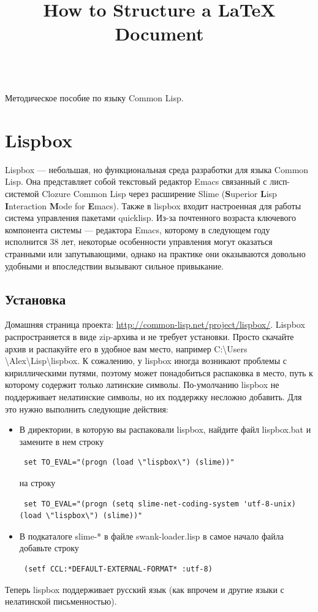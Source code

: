 \documentclass[a4paper, 10pt, titlepage, twoside]{article}
\begin{document}
\title{How to Structure a LaTeX Document}
\begin{titlepage}
  \begin{center}
    \vspace{10pt}
    
    \\
    \vspace{120pt}
    \Huge{Методическое пособие по языку Common Lisp.}
    \end{center}
\end{titlepage}

\section{Lispbox}
Lispbox --- небольшая, но функциональная среда разработки для языка Common Lisp. Она представляет собой текстовый редактор Emacs связанный с лисп-системой Clozure Common Lisp через расширение Slime (\textbf{S}uperior \textbf{L}isp \textbf{I}nteraction \textbf{M}ode for \textbf{E}macs). Также в lispbox входит настроенная для работы система управления пакетами quicklisp. Из-за почтенного возраста ключевого компонента системы --- редактора Emacs, которому в следующем году исполнится 38 лет, некоторые особенности управления могут оказаться странными или запутывающими, однако на практике они оказываются довольно удобными и впоследствии вызывают сильное привыкание.
\subsection{Установка}
Домашняя страница проекта: \url{http://common-lisp.net/project/lispbox/}. Lispbox распространяется в виде zip-архива и не требует установки. Просто скачайте архив и распакуйте его в удобное вам место, например C:\textbackslash{}Users
\textbackslash{}Alex\textbackslash{}Lisp\textbackslash{}lispbox. К сожалению, у lispbox иногда возникают проблемы с кириллическими путями, поэтому может понадобиться распаковка в место, путь к которому содержит только латинские символы.
По-умолчанию lispbox не поддерживает нелатинские символы, но их поддержку несложно добавить. Для это нужно выполнить следующие действия:
\begin{itemize}
\item В директории, в которую вы распаковали lispbox, найдите файл lispbox.bat и замените в нем строку 
  \footnotesize
  \begin{verbatim} set TO_EVAL="(progn (load \"lispbox\") (slime))" \end{verbatim}
  \normalsize
  на строку
  \footnotesize
  \begin{verbatim} set TO_EVAL="(progn (setq slime-net-coding-system 'utf-8-unix)(load \"lispbox\") (slime))" \end{verbatim}
  \normalsize
\item В подкаталоге slime-* в файле swank-loader.lisp в самое начало файла добавьте строку
  \footnotesize
  \begin{verbatim} (setf CCL:*DEFAULT-EXTERNAL-FORMAT* :utf-8) \end{verbatim}
  \normalsize
\end{itemize}
Теперь lispbox поддерживает русский язык (как впрочем и другие языки с нелатинской письменностью).
\end{document}
